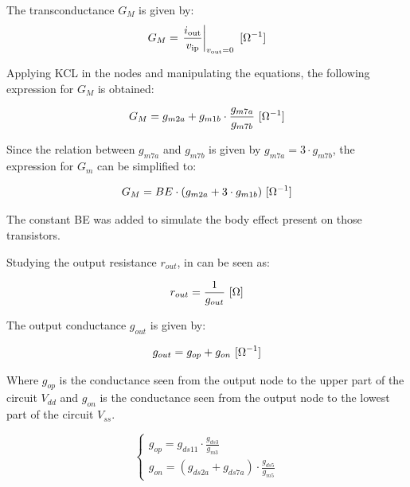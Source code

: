 The transconductance $G_M$ is given by:
\begin{equation}
G_M = \left. \frac{i_{\text{out}}}{v_{\text{ip}}} \right|_{v_{\text{out}}=0} \ [\Omega ^{-1}] \\
\label{eq:Gm_general}
\end{equation}

Applying KCL in the nodes and manipulating the equations, the following expression for $G_M$ is obtained:

\begin{equation}
    G_M = g_{m2a} + g_{m1b} \cdot \frac{g_{m7a}}{g_{m7b}} \ [\Omega ^{-1}] \\
    \label{eq:GM_symbols}
\end{equation}

Since the relation between $g_{m7a}$ and $g_{m7b}$ is given by $g_{m7a} = 3 \cdot g_{m7b}$, the expression for $G_m$ can be simplified to:  

\begin{equation}
    G_M = BE \cdot (g_{m2a} + 3 \cdot g_{m1b}) \ [\Omega ^{-1}] \\
    \label{eq:GM_BE}
\end{equation}

The constant BE was added to simulate the body effect present on those transistors.

Studying the output resistance $r_{out}$, in can be seen as:

\begin{equation}
    r_{out} = \frac{1}{g_{out}} \ [\Omega] \\
    \label{eq:rout}
\end{equation}

The output conductance $g_{out}$ is given by:

\begin{equation}
    g_{out} = g_{op} + g_{on} \ [\Omega ^{-1}] \\
    \label{eq:gout}
\end{equation}

Where $g_{op}$ is the conductance seen from the output node to the upper part of the circuit $V_{dd}$ and $g_{on}$ is the conductance seen from the output node to the lowest part of the circuit $V_{ss}$.

\begin{equation}
    \begin{cases}
        g_{op} = g_{ds11} \cdot \frac{g_{ds3}}{g_{m3}} \\
        g_{on} = \left( g_{ds2a} + g_{ds7a} \right) \cdot \frac{g_{ds5}}{g_{m5}}
    \end{cases}
    \label{eq:output_conductance}
\end{equation}

